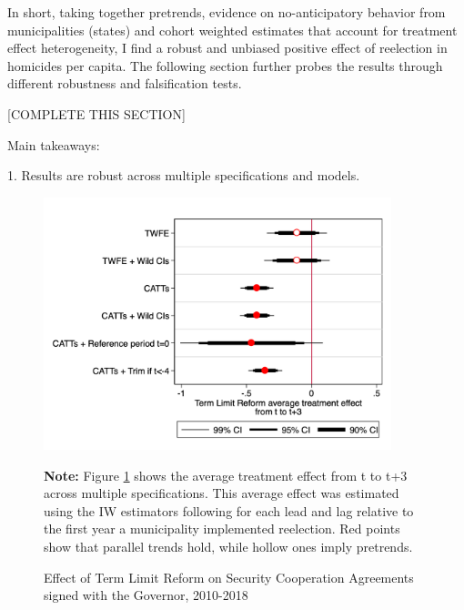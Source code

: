 \documentclass[12pt]{amsart}
\makeatletter
\def\section{\@startsection{section}{1}
	\z@{1.0\linespacing\@plus\linespacing}{.5\linespacing}{\Large}}
\numberwithin{equation}{section}
\theoremstyle{definition}
\theoremstyle{definition}
\theoremstyle{definition}
\makeatother
\begin{document}
In short, taking together pretrends, evidence on no-anticipatory behavior from municipalities (states) and cohort weighted estimates that account for treatment effect heterogeneity, I find a robust and unbiased positive effect of reelection in homicides per capita.  The following section further probes the results through different robustness and falsification tests.%
       

\section{Robustness}

[COMPLETE THIS SECTION]

  
Main takeaways: 

1. Results are robust across multiple specifications and models. 


  

\begin{figure}[H]   
\centering
 \caption{Effect of Term Limit Reform on Security Cooperation Agreements signed with the Governor, 2010-2018}
 \label{fig:robustness_agreements}
\includegraphics[width=0.9\textwidth]{../Figures/average_effects.png}
       \captionsetup{justification=centering}
       
 \textbf{Note:} Figure \ref{fig:robustness_agreements} shows the average treatment effect from t to t+3 across multiple specifications. This average effect was estimated using the IW estimators following \citet{abraham_sun_2020} for each lead and lag relative to the first year a municipality implemented reelection. Red points show that parallel trends hold, while hollow ones imply pretrends. 
\end{figure}   
\end{document}
